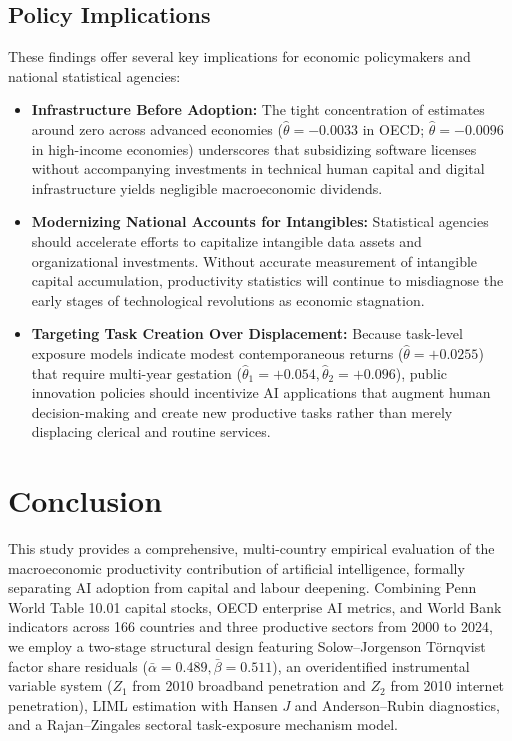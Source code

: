 \documentclass[11pt,a4paper]{article}
\begin{document}
\subsection{Policy Implications}
These findings offer several key implications for economic policymakers and national statistical agencies:
\begin{itemize}
    \item \textbf{Infrastructure Before Adoption:} The tight concentration of estimates around zero across advanced economies ($\hat{\theta} = -0.0033$ in OECD; $\hat{\theta} = -0.0096$ in high-income economies) underscores that subsidizing software licenses without accompanying investments in technical human capital and digital infrastructure yields negligible macroeconomic dividends.
    \item \textbf{Modernizing National Accounts for Intangibles:} Statistical agencies should accelerate efforts to capitalize intangible data assets and organizational investments. Without accurate measurement of intangible capital accumulation, productivity statistics will continue to misdiagnose the early stages of technological revolutions as economic stagnation.
    \item \textbf{Targeting Task Creation Over Displacement:} Because task-level exposure models indicate modest contemporaneous returns ($\hat{\theta} = +0.0255$) that require multi-year gestation ($\hat{\theta}_1 = +0.054, \hat{\theta}_2 = +0.096$), public innovation policies should incentivize AI applications that augment human decision-making and create new productive tasks rather than merely displacing clerical and routine services.
\end{itemize}

\section{Conclusion}
\label{sec:conclusion}

This study provides a comprehensive, multi-country empirical evaluation of the macroeconomic productivity contribution of artificial intelligence, formally separating AI adoption from capital and labour deepening. Combining Penn World Table 10.01 capital stocks, OECD enterprise AI metrics, and World Bank indicators across 166 countries and three productive sectors from 2000 to 2024, we employ a two-stage structural design featuring Solow--Jorgenson Törnqvist factor share residuals ($\bar{\alpha} = 0.489, \bar{\beta} = 0.511$), an overidentified instrumental variable system ($Z_1$ from 2010 broadband penetration and $Z_2$ from 2010 internet penetration), LIML estimation with Hansen $J$ and Anderson--Rubin diagnostics, and a Rajan--Zingales sectoral task-exposure mechanism model.
\end{document}

